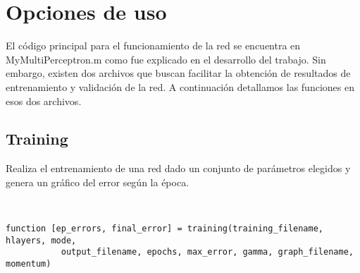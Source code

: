 \documentclass[informe.tex]{subfiles}
\begin{document}
  
  \section{Opciones de uso}
  
    El código principal para el funcionamiento de la red se encuentra en MyMultiPerceptron.m como fue explicado en el desarrollo del trabajo. Sin embargo, existen dos archivos que buscan facilitar la obtenci\'on de resultados de entrenamiento y validaci\'on de la red. A continuaci\'on detallamos las funciones en esos dos archivos.
    
    \subsection{Training}
    
    Realiza el entrenamiento de una red dado un conjunto de parámetros elegidos y genera un gráfico del error según la época.
    
    ~
    
    \verb|function [ep_errors, final_error] = training(training_filename, hlayers, mode, | \\
    \verb|           output_filename, epochs, max_error, gamma, graph_filename, momentum)|
    
\end{document}
